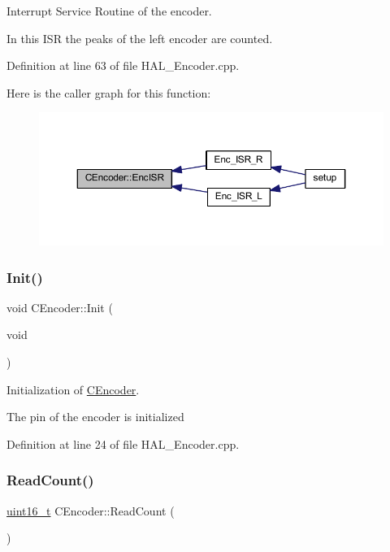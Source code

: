 Interrupt Service Routine of the encoder. 

In this I\+SR the peaks of the left encoder are counted. 

Definition at line 63 of file H\+A\+L\+\_\+\+Encoder.\+cpp.

Here is the caller graph for this function\+:
\nopagebreak
\begin{figure}[H]
\begin{center}
\leavevmode
\includegraphics[width=350pt]{class_c_encoder_aa64baac0c38ee19af8572e8da4838582_icgraph}
\end{center}
\end{figure}
\mbox{\label{class_c_encoder_a99a1c676b3fd3e6f253b273b2d740aab}} 
\subsubsection{\texorpdfstring{Init()}{Init()}}
{\footnotesize\ttfamily void C\+Encoder\+::\+Init (\begin{DoxyParamCaption}\item[{void}]{ }\end{DoxyParamCaption})}



Initialization of \mbox{\hyperlink{class_c_encoder}{C\+Encoder}}. 

The pin of the encoder is initialized 

Definition at line 24 of file H\+A\+L\+\_\+\+Encoder.\+cpp.

\mbox{\label{class_c_encoder_a5911a289a7ed8a32e0a89e6191e1651c}} 
\subsubsection{\texorpdfstring{Read\+Count()}{ReadCount()}}
{\footnotesize\ttfamily \mbox{\hyperlink{_a_d_a_s___types_8h_a1f1825b69244eb3ad2c7165ddc99c956}{uint16\+\_\+t}} C\+Encoder\+::\+Read\+Count (\begin{DoxyParamCaption}{ }\end{DoxyParamCaption})}



